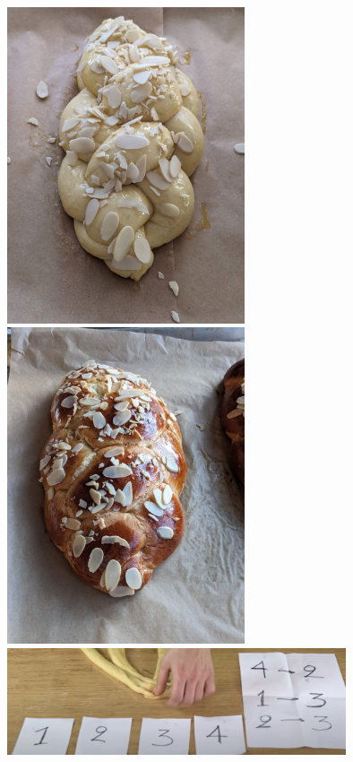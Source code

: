 \begin{figure}
  \includegraphics[width=70mm]{velsa/images/PXL_20240331_211621965.PORTRAIT.ORIGINAL.jpg}
  \includegraphics[width=70mm]{velsa/images/PXL_20240331_230346663.PORTRAIT.ORIGINAL.jpg}
  \vspace*{\baselineskip}
  \includegraphics[width=100mm]{velsa/images/Tsoureki braid_Aki.PNG}
\end{figure}